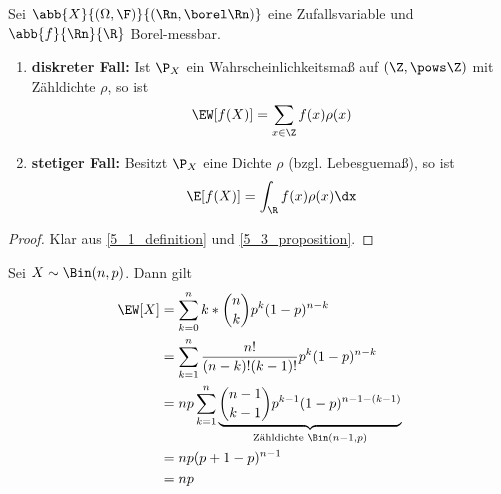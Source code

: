 \begin{proposition}
	\label{5_4_proposition}
	Sei $\abb{X}{(\Omega, \F)}{(\Rn, \borel\Rn)}$ eine Zufallsvariable und $\abb{f}{\Rn}{\R}$ Borel-messbar.
	\begin{enumerate}
		\item \textbf{diskreter Fall:} Ist $\P_X$ ein Wahrscheinlichkeitsmaß auf $(\Z, \pows\Z)$ mit Zähldichte $\rho$, so ist
		\begin{equation*}
			\EW[f(X)] = \sum_{x \in \Z} f(x)\rho(x)
		\end{equation*}
		\item \textbf{stetiger Fall:} Besitzt $\P_X$ eine Dichte $\rho$ (bzgl. Lebesguemaß), so ist
		\begin{equation*}
			\E[f(X)] = \int_{\R} f(x)\rho(x) \dx
		\end{equation*}
	\end{enumerate}
\end{proposition}
\begin{proof}
	Klar aus \cref{5_1_definition} und \cref{5_3_proposition}.
\end{proof}

\begin{beispiel}
	\label{5_5_beispiel}
	Sei $X \sim \Bin(n,p)$. Dann gilt
	\begin{align*}
		\EW[X] 
		&= \sum_{k=0}^n k * \binom{n}{k} p^k (1-p)^{n-k} \\
		&= \sum_{k=1}^n \frac{n!}{(n-k)!(k-1)!} p^k (1-p)^{n-k}\\
		&= np \sum_{k=1}^n \underbrace{\binom{n-1}{k-1} p^{k-1}(1-p)^{n-1-(k-1)}}_{\text{Zähldichte }\Bin(n-1,p)} \\
		&= n p (p+1-p)^{n-1} \\
		&= np
	\end{align*}
\end{beispiel}

